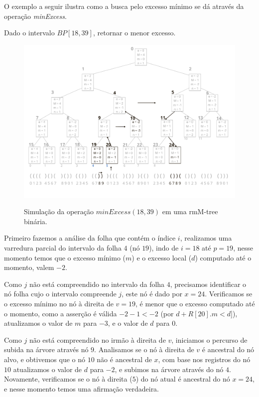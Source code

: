     O exemplo a seguir ilustra como a busca pelo excesso mínimo se dá através da operação \textit{minExcess}.
    \begin{example}
        Dado o intervalo $BP[18,39]$, retornar o menor excesso.

       \begin{figure}[!ht]
           \centering
             \caption[minExcess(18,39).]{Simulação da operação $minExcess(18,39)$ em uma rmM-tree binária.}
             \includegraphics[width=\columnwidth]{images/rmm-tree-bin-minexcess.png}
             \label{fig:bin-minexcess}
        \end{figure}

        Primeiro fazemos a análise da folha que contém o índice $i$, realizamos uma varredura parcial do intervalo da folha $4$ (nó $19$), indo de $i=18$ até $p=19$, nesse momento temos que o excesso mínimo ($m$) e o excesso local ($d$) computado até o momento, valem $-2$.

        Como $j$ não está compreendido no intervalo da folha $4$, precisamos identificar o nó folha cujo o intervalo compreende $j$, este nó é dado por $x=24$. Verificamos se o excesso mínimo no nó à direita de $v=19$, é menor que o excesso computado até o momento, como a asserção é válida $-2 -1 < -2$ (por $d + R[20].m < d]$), atualizamos o valor de $m$ para $-3$, e o valor de $d$ para $0$.

        Como $j$ não está compreendido no irmão à direita de $v$, iniciamos o percurso de subida na árvore através nó $9$. Analisamos se o nó à direita de $v$ é ancestral do nó alvo, e obtivemos que o nó $10$ não é ancestral de $x$, com base nos registros do nó $10$ atualizamos o valor de $d$ para $-2$, e subimos na árvore através do nó $4$. Novamente, verificamos se o nó à direita ($5$) do nó atual é ancestral do nó $x=24$, e nesse momento
        temos uma afirmação verdadeira. 
        

\end{example}
